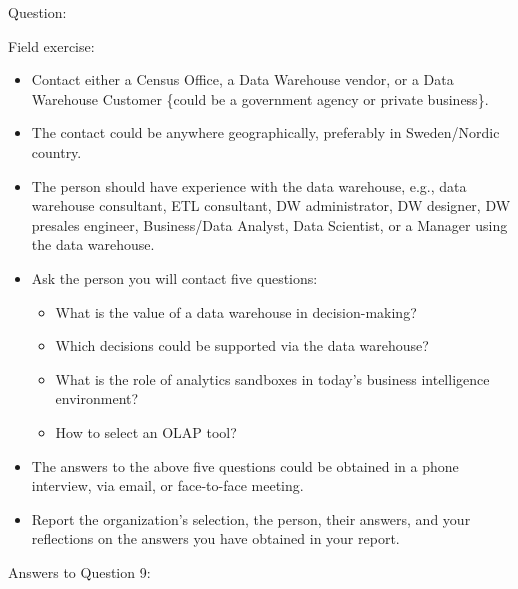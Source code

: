 Question:\\
\begin{em}
Field exercise:

\begin{itemize}
    \item Contact either a Census Office, a Data Warehouse vendor, or a Data Warehouse
    Customer \{could be a government agency or private business\}.
    
    \item The contact could be anywhere geographically, preferably in Sweden/Nordic
    country.
    
    \item The person should have experience with the data warehouse, e.g., data
    warehouse consultant, ETL consultant, DW administrator, DW designer, DW presales
    engineer, Business/Data Analyst, Data Scientist, or a Manager using the
    data warehouse.
    
    \item Ask the person you will contact five questions:
    \begin{itemize}
        \item What is the value of a data warehouse in decision-making?
        \item Which decisions could be supported via the data warehouse?
        \item What is the role of analytics sandboxes in today's business intelligence environment?
        \item How to select an OLAP tool?
    \end{itemize}
    
    \item The answers to the above five questions could be obtained in a phone interview,
    via email, or face-to-face meeting.
    
    \item Report the organization's selection, the person, their answers, and your
    reflections on the answers you have obtained in your report.
\end{itemize}
\end{em}
Answers to Question 9:
